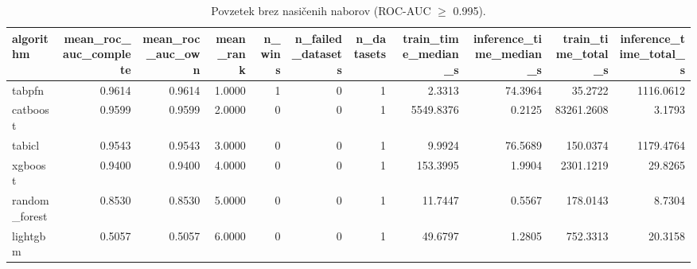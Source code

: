 \begin{table}[htbp]
\centering
\caption{Povzetek brez nasičenih naborov (ROC-AUC $\geq$ 0.995).}
\label{tab:overall-nonsat}
\begin{tabular}{lrrrrrrrrrr}
\hline
algorithm & mean\_roc\_auc\_complete & mean\_roc\_auc\_own & mean\_rank & n\_wins & n\_failed\_datasets & n\_datasets & train\_time\_median\_s & inference\_time\_median\_s & train\_time\_total\_s & inference\_time\_total\_s \\
\hline
tabpfn & 0.9614 & 0.9614 & 1.0000 & 1 & 0 & 1 & 2.3313 & 74.3964 & 35.2722 & 1116.0612 \\
catboost & 0.9599 & 0.9599 & 2.0000 & 0 & 0 & 1 & 5549.8376 & 0.2125 & 83261.2608 & 3.1793 \\
tabicl & 0.9543 & 0.9543 & 3.0000 & 0 & 0 & 1 & 9.9924 & 76.5689 & 150.0374 & 1179.4764 \\
xgboost & 0.9400 & 0.9400 & 4.0000 & 0 & 0 & 1 & 153.3995 & 1.9904 & 2301.1219 & 29.8265 \\
random\_forest & 0.8530 & 0.8530 & 5.0000 & 0 & 0 & 1 & 11.7447 & 0.5567 & 178.0143 & 8.7304 \\
lightgbm & 0.5057 & 0.5057 & 6.0000 & 0 & 0 & 1 & 49.6797 & 1.2805 & 752.3313 & 20.3158 \\
\hline
\end{tabular}
\end{table}
